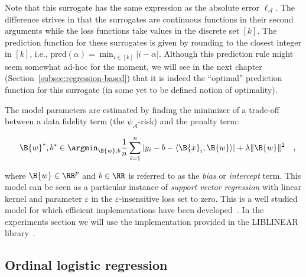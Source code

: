 Note that this surrogate has the same expression as the absolute error $\ell_{\mathcal{A}}$. The difference strives in that the surrogates are continuous functions in their second arguments while the loss functions take values in the discrete set $[k]$. The prediction function for these surrogates is given by rounding to the closest integer in $[k]$, i.e., $\text{pred}(\alpha) = \min_{i \in [k]} |i - \alpha|$. Although this prediction rule might seem somewhat ad-hoc for the moment, we will see in the next chapter (Section~\ref{subsec:regression-based}) that it is indeed the ``optimal'' prediction function for this surrogate (in some yet to be defined notion of optimality).


The model parameters are estimated by finding the minimizer of a trade-off between a data fidelity term (the $\psi_{\mathcal{A}}$-risk) and the penalty term:


\begin{equation*}
 \quad \B{w}^*, b^* \in \argmin_{\B{w}, b} \frac{1}{n}\sum_{i=1}^n |y_i - b - \langle \B{x}_i, \B{w} \rangle|  + \lambda \|\B{w}\|^2 \quad ,
\end{equation*}


where $\B{w} \in \RR^{p}$ and $b \in \RR$ is referred to as the \emph{bias} or \emph{intercept} term. This model can be seen as a particular instance of \emph{support vector regression} with linear kernel and parameter $\varepsilon$ in the $\varepsilon$-insensitive loss set to zero. This is a well studied model for which efficient implementations have been developed~\citep{ho2012large, fan2008liblinear}. In the experiments section we will use the implementation provided in the \textrm{LIBLINEAR} library~\citep{fan2008liblinear}.



\subsection{Ordinal logistic regression}





